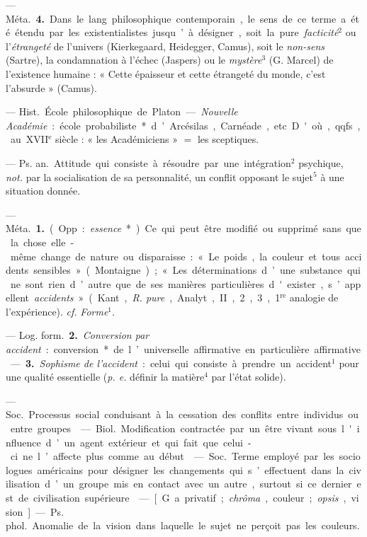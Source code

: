 \begin{itemize}[leftmargin=1cm, label=, itemsep=1pt]
— \si{Méta.} {\bf 4.} Dans le lang. philosophique contemporain, le sens de
ce terme a été étendu par les existentialistes jusqu’à désigner, soit la
pure {\it facticité}$^2$ ou l'{\it étrangeté} de l'univers (Kierkegaard, Heidegger, Camus),
soit le {\it non-sens} (Sartre), la
condamnation à l'échec (Jaspers) ou
le {\it mystère}$^3$ (G. Marcel) de l'existence
humaine : « Cette épaisseur et cette
étrangeté du monde, c’est l'absurde »
(Camus).

 — \si{Hist.} École philosophique de Platon.
— {\it Nouvelle Académie} :
école probabiliste* d’Arcésilas, Carnéade, etc. D'où, qqfs., au
{\footnotesize XVII}$^\text{e}$ siècle : « les Académiciens »
$=$ les sceptiques.

 — \si{Ps. an.} Attitude qui
consiste à résoudre par une intégration$^2$ psychique, {\it not.} par la socialisation
de sa personnalité, un conflit
opposant le sujet$^5$ à une situation
donnée.

 — \si{Méta.} {\bf 1.} (Opp. : {\it essence}*).
Ce qui peut être modifié ou supprimé sans que la chose elle-même
change de nature ou disparaisse :
« Le poids, la couleur et tous accidents sensibles » (Montaigne); « Les
déterminations d’une substance qui
ne sont rien d’autre que de ses manières particulières d'exister,
s’appellent {\it accidents} » (Kant, {\it R. pure},
Analyt., II, 2, 3, 1$^\text{re}$ analogie de l’expérience). {\it cf.}  {\it Forme}$^1$.

— \si{Log. form.} {\bf 2.} {\it Conversion par
accident} : conversion* de l’universelle affirmative en particulière
affirmative. — {\bf 3.} {\it Sophisme de l’accident} : celui qui consiste à prendre
un accident$^1$ pour une qualité essentielle ({\it p. e.} définir la matière$^4$ par
l’état solide).

 — \si{Soc.} Processus
social conduisant à la cessation des
conflits entre individus ou entre
groupes.

 — \si{Biol.} Modification
contractée par un être vivant sous
l'influence d’un agent extérieur et
qui fait que celui-ci ne l’affecte plus
comme au début.

 — \si{Soc.} Terme employé
par les sociologues américains pour
désigner les changements qui s’effectuent dans la civilisation d’un groupe
mis en contact avec un autre, surtout si ce dernier est de civilisation
supérieure.

 — [G. a privatif; {\it chrôma},
couleur; {\it opsis}, vision] — \si{Ps. phol.}
Anomalie de la vision dans laquelle
le sujet ne perçoit pas les couleurs.


\end{itemize}
